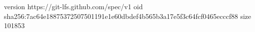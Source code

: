 version https://git-lfs.github.com/spec/v1
oid sha256:7ac64e18875372507501191e1e60dbdef4b565b3a17e5f3c64fcf0465ecccf88
size 101853
